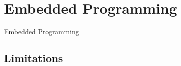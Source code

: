 \documentclass{beamer}
\begin{document}
\begin{frame}
\titlepage

\setcounter{tocdepth}{1}
\tableofcontents
\end{frame}


\section{Embedded Programming} %
\begin{frame}
\centering \huge Embedded Programming
\end{frame}

\subsection{Limitations}
\end{document}
